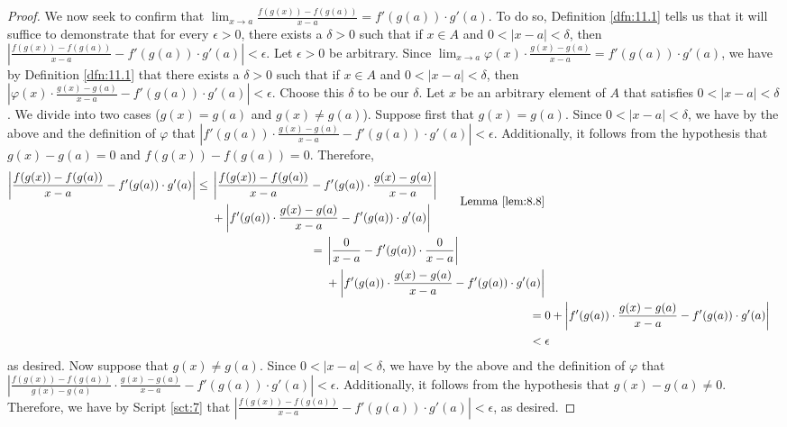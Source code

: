 \documentclass[../main.tex]{subfiles}
\begin{document}
\begin{theorem}
\begin{proof}
        We now seek to confirm that $\lim_{x\to a}\frac{f(g(x))-f(g(a))}{x-a}=f'(g(a))\cdot g'(a)$. To do so, Definition \ref{dfn:11.1} tells us that it will suffice to demonstrate that for every $\epsilon>0$, there exists a $\delta>0$ such that if $x\in A$ and $0<|x-a|<\delta$, then $|\frac{f(g(x))-f(g(a))}{x-a}-f'(g(a))\cdot g'(a)|<\epsilon$. Let $\epsilon>0$ be arbitrary. Since $\lim_{x\to a}\varphi(x)\cdot\frac{g(x)-g(a)}{x-a}=f'(g(a))\cdot g'(a)$, we have by Definition \ref{dfn:11.1} that there exists a $\delta>0$ such that if $x\in A$ and $0<|x-a|<\delta$, then $|\varphi(x)\cdot\frac{g(x)-g(a)}{x-a}-f'(g(a))\cdot g'(a)|<\epsilon$. Choose this $\delta$ to be our $\delta$. Let $x$ be an arbitrary element of $A$ that satisfies $0<|x-a|<\delta$. We divide into two cases ($g(x)=g(a)$ and $g(x)\neq g(a)$). Suppose first that $g(x)=g(a)$. Since $0<|x-a|<\delta$, we have by the above and the definition of $\varphi$ that $|f'(g(a))\cdot\frac{g(x)-g(a)}{x-a}-f'(g(a))\cdot g'(a)|<\epsilon$. Additionally, it follows from the hypothesis that $g(x)-g(a)=0$ and $f(g(x))-f(g(a))=0$. Therefore,
        \begin{align*}
            \begin{split}
                \left| \frac{f(g(x))-f(g(a))}{x-a}-f'(g(a))\cdot g'(a) \right| \leq{}& \left| \frac{f(g(x))-f(g(a))}{x-a}-f'(g(a))\cdot\frac{g(x)-g(a)}{x-a} \right|\\
                &+ \left| f'(g(a))\cdot\frac{g(x)-g(a)}{x-a}-f'(g(a))\cdot g'(a) \right|
            \end{split}\tag*{Lemma \ref{lem:8.8}}\\
            \begin{split}
                ={}& \left| \frac{0}{x-a}-f'(g(a))\cdot\frac{0}{x-a} \right|\\
                &+ \left| f'(g(a))\cdot\frac{g(x)-g(a)}{x-a}-f'(g(a))\cdot g'(a) \right|
            \end{split}\\
            ={}& 0+\left| f'(g(a))\cdot\frac{g(x)-g(a)}{x-a}-f'(g(a))\cdot g'(a) \right|\\
            <{}& \epsilon
        \end{align*}
        as desired. Now suppose that $g(x)\neq g(a)$. Since $0<|x-a|<\delta$, we have by the above and the definition of $\varphi$ that $|\frac{f(g(x))-f(g(a))}{g(x)-g(a)}\cdot\frac{g(x)-g(a)}{x-a}-f'(g(a))\cdot g'(a)|<\epsilon$. Additionally, it follows from the hypothesis that $g(x)-g(a)\neq 0$. Therefore, we have by Script \ref{sct:7} that $|\frac{f(g(x))-f(g(a))}{x-a}-f'(g(a))\cdot g'(a)|<\epsilon$, as desired.\par

\end{proof}
\end{theorem}
\end{document}
